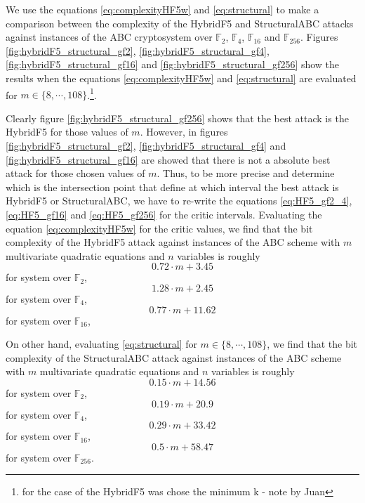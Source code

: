 We use the equations \eqref{eq:complexityHF5w} and \eqref{eq:structural} to make a comparison between the complexity of the HybridF5 and StructuralABC attacks against instances of the ABC cryptosystem over $\mathbb{F}_2$, $\mathbb{F}_4$, $\mathbb{F}_{16}$ and $\mathbb{F}_{256}$. Figures \ref{fig:hybridF5_structural_gf2}, \ref{fig:hybridF5_structural_gf4}, \ref{fig:hybridF5_structural_gf16} and \ref{fig:hybridF5_structural_gf256} show the results when the equations \eqref{eq:complexityHF5w} and \eqref{eq:structural} are evaluated for $m \in \{8,\cdots,108\}$.\footnote{for the case of the HybridF5 was chose the minimum k - note by Juan}.

Clearly figure \ref{fig:hybridF5_structural_gf256} shows that the best attack is the HybridF5 for those values of $m$. However, in figures \ref{fig:hybridF5_structural_gf2}, \ref{fig:hybridF5_structural_gf4} and \ref{fig:hybridF5_structural_gf16} are showed that there is not a absolute best attack for those chosen values of $m$. Thus, to be more precise and determine which is the intersection point that define at which interval the best attack is HybridF5 or StructuralABC, we have to re-write the equations \eqref{eq:HF5_gf2_4}, \eqref{eq:HF5_gf16} and  \eqref{eq:HF5_gf256} for the critic intervals. Evaluating the equation \eqref{eq:complexityHF5w} for the critic values, we find that the bit complexity of the HybridF5 attack against instances of the ABC scheme with $m$ multivariate quadratic equations and $n$ variables is roughly
\begin{equation}
0.72\cdot m+ 3.45
\end{equation}
for system over $\mathbb{F}_2$,
\begin{equation}
1.28\cdot m + 2.45
\end{equation}
for system over $\mathbb{F}_4$,
\begin{equation}
0.77\cdot m + 11.62
\end{equation}
for system over $\mathbb{F}_{16}$,

On other hand, evaluating \eqref{eq:structural} for $m\in \{8,\cdots,108\}$, we find that the bit complexity of the StructuralABC attack against instances of the ABC scheme with $m$ multivariate quadratic equations and $n$ variables is roughly
\begin{equation}0.15\cdot m + 14.56\label{eq:structuralgf2}\end{equation}
for system over $\mathbb{F}_2$,
\begin{equation}0.19\cdot m + 20.9\label{eq:structuralgf4}\end{equation}
for system over $\mathbb{F}_4$,
\begin{equation}0.29\cdot m + 33.42\label{eq:structuralgf16}\end{equation}
for system over $\mathbb{F}_{16}$,
\begin{equation}0.5\cdot m + 58.47\label{eq:structuralgf256}\end{equation}
for system over $\mathbb{F}_{256}$.

